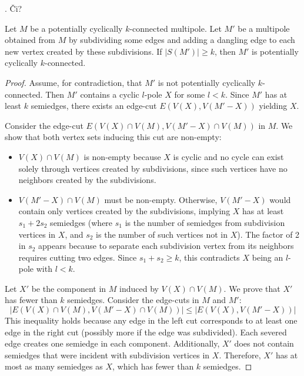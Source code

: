 \documentclass[12pt, twoside]{book}
\begin{document}
\begin{lemma}
	. Či?
\end{lemma}

\begin{theorem}\label{th:subdivisions-potentially-cyclically-connected}
	Let $M$ be a potentially cyclically $k$-connected multipole. Let $M'$ be a multipole obtained from $M$ by subdividing some edges and adding a dangling edge to each new vertex created by these subdivisions. If $|S(M')|\geq k$, then $M'$ is potentially cyclically $k$-connected.
\end{theorem}

\begin{proof}
	Assume, for contradiction, that $M'$ is not potentially cyclically $k$-connected. Then $M'$ contains a cyclic $l$-pole $X$ for some $l<k$. Since $M'$ has at least $k$ semiedges, there exists an edge-cut $E(V(X),V(M'-X))$ yielding $X$.
	
	Consider the edge-cut $E(V(X)\cap V(M), V(M'-X)\cap V(M))$ in $M$. We show that both vertex sets inducing this cut are non-empty:
	\begin{itemize}
		\item $V(X)\cap V(M)$ is non-empty because $X$ is cyclic and no cycle can exist solely through vertices created by subdivisions, since such vertices have no neighbors created by the subdivisions.
		\item $V(M'-X)\cap V(M)$ must be non-empty. Otherwise, $V(M'-X)$ would contain only vertices created by the subdivisions, implying $X$ has at least $s_1+2s_2$ semiedges (where $s_1$ is the number of semiedges from subdivision vertices in $X$, and $s_2$ is the number of such vertices not in $X$). The factor of 2 in $s_2$ appears because to separate each subdivision vertex from its neighbors requires cutting two edges. Since $s_1+s_2\geq k$, this contradicts $X$ being an $l$-pole with $l<k$.
	\end{itemize}

	Let $X'$ be the component in $M$ induced by $V(X)\cap V(M)$. We prove that $X'$ has fewer than $k$ semiedges. Consider the edge-cuts in $M$ and $M'$:
	$$|E(V(X)\cap V(M), V(M'-X)\cap V(M))|\leq |E(V(X),V(M'-X))|$$
	This inequality holds because any edge in the left cut corresponds to at least one edge in the right cut (possibly more if the edge was subdivided). Each severed edge creates one semiedge in each component. Additionally, $X'$ does not contain semiedges that were incident with subdivision vertices in $X$. Therefore, $X'$ has at most as many semiedges as $X$, which has fewer than $k$ semiedges.


\end{proof}
\end{document}
